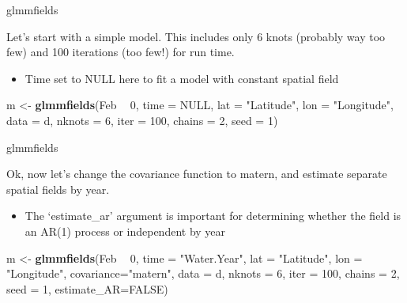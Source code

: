 \documentclass[ignorenonframetext,]{beamer}
\newenvironment{Shaded}{\begin{snugshade}}{\end{snugshade}}
\newcommand{\DataTypeTok}[1]{\textcolor[rgb]{0.13,0.29,0.53}{#1}}
\newcommand{\DecValTok}[1]{\textcolor[rgb]{0.00,0.00,0.81}{#1}}
\newcommand{\KeywordTok}[1]{\textcolor[rgb]{0.13,0.29,0.53}{\textbf{#1}}}
\newcommand{\NormalTok}[1]{#1}
\newcommand{\OperatorTok}[1]{\textcolor[rgb]{0.81,0.36,0.00}{\textbf{#1}}}
\newcommand{\OtherTok}[1]{\textcolor[rgb]{0.56,0.35,0.01}{#1}}
\newcommand{\StringTok}[1]{\textcolor[rgb]{0.31,0.60,0.02}{#1}}
\providecommand{\tightlist}{%
  \setlength{\itemsep}{0pt}\setlength{\parskip}{0pt}}
\begin{document}
\begin{frame}[fragile]{glmmfields}
\protect\hypertarget{glmmfields}{}

Let's start with a simple model. This includes only 6 knots (probably
way too few) and 100 iterations (too few!) for run time.

\begin{itemize}
\tightlist
\item
  Time set to NULL here to fit a model with constant spatial field
\end{itemize}

\begin{Shaded}
\begin{Highlighting}[]
\NormalTok{m <-}\StringTok{ }\KeywordTok{glmmfields}\NormalTok{(Feb }\OperatorTok{~}\StringTok{ }\DecValTok{0}\NormalTok{, }\DataTypeTok{time =} \OtherTok{NULL}\NormalTok{,}
 \DataTypeTok{lat =} \StringTok{"Latitude"}\NormalTok{, }\DataTypeTok{lon =} \StringTok{"Longitude"}\NormalTok{, }\DataTypeTok{data =}\NormalTok{ d,}
 \DataTypeTok{nknots =} \DecValTok{6}\NormalTok{, }\DataTypeTok{iter =} \DecValTok{100}\NormalTok{, }\DataTypeTok{chains =} \DecValTok{2}\NormalTok{, }\DataTypeTok{seed =} \DecValTok{1}\NormalTok{)}
\end{Highlighting}
\end{Shaded}

\end{frame}

\begin{frame}[fragile]{glmmfields}
\protect\hypertarget{glmmfields-1}{}

Ok, now let's change the covariance function to matern, and estimate
separate spatial fields by year.

\begin{itemize}
\tightlist
\item
  The `estimate\_ar' argument is important for determining whether the
  field is an AR(1) process or independent by year
\end{itemize}

\begin{Shaded}
\begin{Highlighting}[]
\NormalTok{m <-}\StringTok{ }\KeywordTok{glmmfields}\NormalTok{(Feb }\OperatorTok{~}\StringTok{ }\DecValTok{0}\NormalTok{, }\DataTypeTok{time =} \StringTok{"Water.Year"}\NormalTok{,}
 \DataTypeTok{lat =} \StringTok{"Latitude"}\NormalTok{, }\DataTypeTok{lon =} \StringTok{"Longitude"}\NormalTok{, }\DataTypeTok{covariance=}\StringTok{"matern"}\NormalTok{,}
  \DataTypeTok{data =}\NormalTok{ d, }\DataTypeTok{nknots =} \DecValTok{6}\NormalTok{, }\DataTypeTok{iter =} \DecValTok{100}\NormalTok{, }\DataTypeTok{chains =} \DecValTok{2}\NormalTok{, }\DataTypeTok{seed =} \DecValTok{1}\NormalTok{,}
  \DataTypeTok{estimate_AR=}\OtherTok{FALSE}\NormalTok{)}
\end{Highlighting}
\end{Shaded}

\end{frame}
\end{document}
